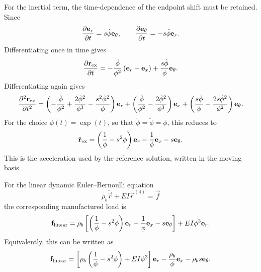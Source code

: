 For the inertial term, the time-dependence of the endpoint shift must be
retained. Since
\begin{equation*}
    \pdv{\vec e_r}{t} = s\dot{\phi}\vec e_\theta, \qquad
    \pdv{\vec e_\theta}{t} = -s\dot{\phi}\vec e_r.
\end{equation*}
Differentiating once in time gives
\begin{equation*}
    \pdv{\vec r_{\rm ex}}{t}
    =
    -\frac{\dot{\phi}}{\phi^2}\left(\vec e_r-\vec e_x\right)
    + \frac{s\dot{\phi}}{\phi}\vec e_\theta.
\end{equation*}
Differentiating again gives
\begin{equation*}
    \pdv[2]{\vec r_{\rm ex}}{t}
    =
    \left(-\frac{\ddot{\phi}}{\phi^2}
    + \frac{2\dot{\phi}^2}{\phi^3}
    - \frac{s^2\dot{\phi}^2}{\phi}\right)\vec e_r
    +
    \left(\frac{\ddot{\phi}}{\phi^2}
    - \frac{2\dot{\phi}^2}{\phi^3}\right)\vec e_x
    +
    \left(\frac{s\ddot{\phi}}{\phi}
    - \frac{2s\dot{\phi}^2}{\phi^2}\right)\vec e_\theta.
\end{equation*}
For the choice \(\phi(t)=\exp{(t)}\), so that \(\dot{\phi}=\ddot{\phi}=\phi\), this reduces to
\begin{equation*}
    \ddot{\vec r}_{\rm ex}
    =
    \left(\frac1\phi - s^2\phi\right)\vec e_r
    - \frac1\phi \vec e_x
    - s\vec e_\theta.
\end{equation*}
This is the acceleration used by the reference solution, written in the moving
basis.

For the linear dynamic Euler--Bernoulli equation
\begin{equation*}
    \rho_b \ddot{\vec r} + EI \vec r^{(4)} = \vec f
\end{equation*}
the corresponding manufactured load is
\begin{equation*}
    \vec f_{\rm linear}
    =
    \rho_b\left[
        \left(\frac1\phi - s^2\phi\right)\vec e_r
        - \frac1\phi \vec e_x
        - s\vec e_\theta
        \right]
    + EI\phi^3\vec e_r.
\end{equation*}
Equivalently, this can be written as
\begin{equation*}
    \vec f_{\rm linear}
    =
    \left[\rho_b\left(\frac1\phi - s^2\phi\right)+EI\phi^3\right]\vec e_r
    - \frac{\rho_b}{\phi}\vec e_x
    - \rho_b s\vec e_\theta.
\end{equation*}

